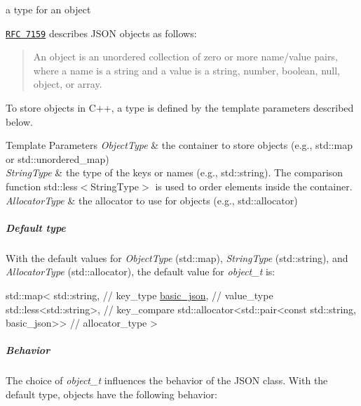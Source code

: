a type for an object 

\href{http://rfc7159.net/rfc7159}{\tt R\+FC 7159} describes J\+S\+ON objects as follows\+: \begin{quote}
An object is an unordered collection of zero or more name/value pairs, where a name is a string and a value is a string, number, boolean, null, object, or array. \end{quote}


To store objects in C++, a type is defined by the template parameters described below.


\begin{DoxyTemplParams}{Template Parameters}
{\em Object\+Type} & the container to store objects (e.\+g., {\ttfamily std\+::map} or {\ttfamily std\+::unordered\+\_\+map}) \\
\hline
{\em String\+Type} & the type of the keys or names (e.\+g., {\ttfamily std\+::string}). The comparison function {\ttfamily std\+::less$<$String\+Type$>$} is used to order elements inside the container. \\
\hline
{\em Allocator\+Type} & the allocator to use for objects (e.\+g., {\ttfamily std\+::allocator})\\
\hline
\end{DoxyTemplParams}
\subparagraph*{Default type}

With the default values for {\itshape Object\+Type} ({\ttfamily std\+::map}), {\itshape String\+Type} ({\ttfamily std\+::string}), and {\itshape Allocator\+Type} ({\ttfamily std\+::allocator}), the default value for {\itshape object\+\_\+t} is\+:


\begin{DoxyCode}
std::map<
  std::string, \textcolor{comment}{// key\_type}
  \hyperlink{classnlohmann_1_1basic__json_a19734fbc9c97d536832892ddacd6b62a}{basic\_json}, \textcolor{comment}{// value\_type}
  std::less<std::string>, \textcolor{comment}{// key\_compare}
  std::allocator<std::pair<const std::string, basic\_json>> \textcolor{comment}{// allocator\_type}
>
\end{DoxyCode}


\subparagraph*{Behavior}

The choice of {\itshape object\+\_\+t} influences the behavior of the J\+S\+ON class. With the default type, objects have the following behavior\+:


